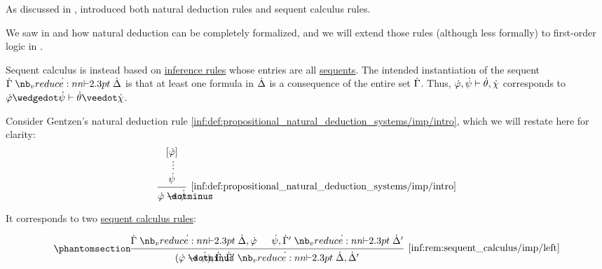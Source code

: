 \begin{remark}\label{rem:sequent_calculus}
  As discussed in ,  introduced both natural deduction rules and sequent calculus rules.

  We saw in  and  how natural deduction can be completely formalized, and we will extend those rules (although less formally) to first-order logic in .

  Sequent calculus is instead based on \hyperref[def:inference_rule]{inference rules} whose entries are all \hyperref[def:sequent]{sequents}. The intended instantiation of the sequent  \( \syn\Gamma \synvdash \syn\Delta \) is that at least one formula in \( \dot{\Delta} \) is a consequence of the entire set \( \dot{\Gamma} \). Thus, \( \dot{\varphi}, \dot{\psi} \vdash \dot{\theta}, \dot{\chi} \) corresponds to \( \syn\varphi \synwedge \syn\psi \vdash \syn\theta \synvee \syn\chi \).

  Consider Gentzen's natural deduction rule \ref{inf:def:propositional_natural_deduction_systems/imp/intro}, which we will restate here for clarity:
  \begin{equation*}
    \begin{prooftree}
      \hypo{ [\syn\varphi] }
      \ellipsis {} { \syn\psi }
      \infer1[\ref{inf:def:propositional_natural_deduction_systems/imp/intro}]{ \syn\varphi \synimplies \syn\psi }
    \end{prooftree}
  \end{equation*}

  It corresponds to two \hyperref[def:abstract_propositional_sequent_calculus_system]{sequent calculus rules}:
  \begin{paracol}{2}
    \begin{leftcolumn}
      \ParacolAlignmentHack
      \begin{equation*}\taglabel[\ensuremath{ \rightarrow_L }]{inf:rem:sequent_calculus/imp/left}
        \begin{prooftree}
          \hypo{ \syn\Gamma \synvdash \syn\Delta, \syn\varphi }
          \hypo{ \syn\psi, \syn\Gamma' \synvdash \syn\Delta' }
          \infer2[\ref{inf:rem:sequent_calculus/imp/left}]{ (\syn\varphi \synimplies \syn\psi), \syn\Gamma, \syn\Gamma' \synvdash \syn\Delta, \syn\Delta' }
        \end{prooftree}
      \end{equation*}
    \end{leftcolumn}


\end{paracol}
\end{remark}
